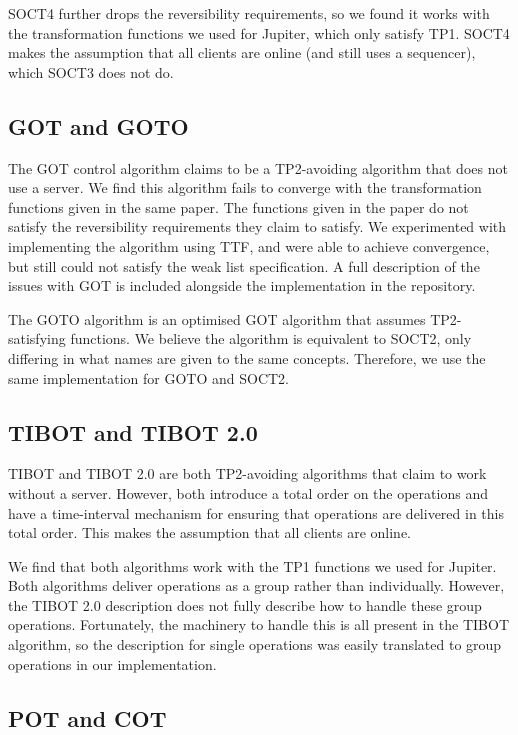 \documentclass[sigplan,10pt,review,anonymous]{acmart}
\begin{document}
SOCT4 \cite{Vidot2000} further drops the reversibility requirements, so we found it works with the transformation functions we used for Jupiter, which only satisfy TP1. SOCT4 makes the assumption that all clients are online (and still uses a sequencer), which SOCT3 does not do.

\subsection{GOT and GOTO} \label{sec:gotimplementation}

The GOT \cite{Sun1998TOCHI} control algorithm claims to be a TP2-avoiding algorithm that does not use a server. We find this algorithm fails to converge with the transformation functions given in the same paper. The functions given in the paper do not satisfy the reversibility requirements they claim to satisfy. We experimented with implementing the algorithm using TTF, and were able to achieve convergence, but still could not satisfy the weak list specification. A full description of the issues with GOT is included alongside the implementation in the repository.

The GOTO \cite{Sun1998CSCW} algorithm is an optimised GOT algorithm that assumes TP2-satisfying functions. We believe the algorithm is equivalent to SOCT2, only differing in what names are given to the same concepts. Therefore, we use the same implementation for GOTO and SOCT2.

\subsection{TIBOT and TIBOT 2.0}

TIBOT \cite{Li2004ICPADS} and TIBOT 2.0 \cite{Xu2014} are both TP2-avoiding algorithms that claim to work without a server. However, both introduce a total order on the operations and have a time-interval mechanism for ensuring that operations are delivered in this total order. This makes the assumption that all clients are online.

We find that both algorithms work with the TP1 functions we used for Jupiter. Both algorithms deliver operations as a group rather than individually. However, the TIBOT 2.0 description does not fully describe how to handle these group operations. Fortunately, the machinery to handle this is all present in the TIBOT algorithm, so the description for single operations was easily translated to group operations in our implementation.


\subsection{POT and COT}
\end{document}

